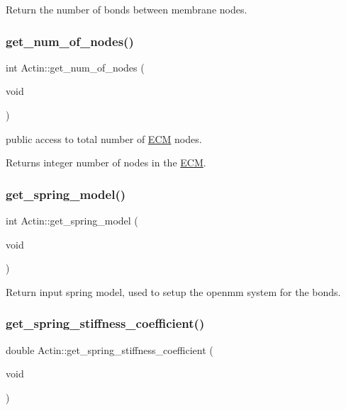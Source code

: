 Return the number of bonds between membrane nodes. \mbox{\label{classActin_a342dea409f97480770a7847533d6516c}} 
\subsubsection{\texorpdfstring{get\_num\_of\_nodes()}{get\_num\_of\_nodes()}}
{\footnotesize\ttfamily int Actin\+::get\+\_\+num\+\_\+of\+\_\+nodes (\begin{DoxyParamCaption}\item[{void}]{ }\end{DoxyParamCaption})\hspace{0.3cm}{\ttfamily [inline]}}



public access to total number of \mbox{\hyperlink{classECM}{E\+CM}} nodes. 

\begin{DoxyReturn}{Returns}
integer number of nodes in the \mbox{\hyperlink{classECM}{E\+CM}}. 
\end{DoxyReturn}
\mbox{\label{classActin_adb7a38c592a496135519c58664752ec9}} 
\subsubsection{\texorpdfstring{get\_spring\_model()}{get\_spring\_model()}}
{\footnotesize\ttfamily int Actin\+::get\+\_\+spring\+\_\+model (\begin{DoxyParamCaption}\item[{void}]{ }\end{DoxyParamCaption})\hspace{0.3cm}{\ttfamily [inline]}}

Return input spring model, used to setup the openmm system for the bonds. \mbox{\label{classActin_abdb4d9b0af05a00dd532e546a69c1371}} 
\subsubsection{\texorpdfstring{get\_spring\_stiffness\_coefficient()}{get\_spring\_stiffness\_coefficient()}}
{\footnotesize\ttfamily double Actin\+::get\+\_\+spring\+\_\+stiffness\+\_\+coefficient (\begin{DoxyParamCaption}\item[{void}]{ }\end{DoxyParamCaption})\hspace{0.3cm}{\ttfamily [inline]}}

